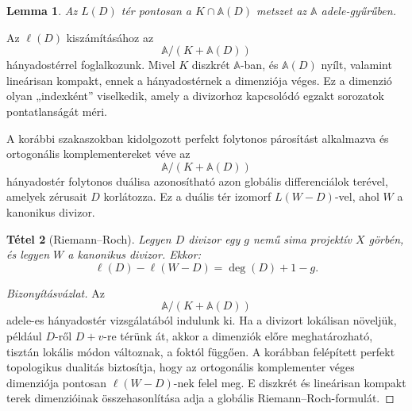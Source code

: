 \documentclass[12pt]{article}
\newtheorem{theorem}{Tétel}[section]
\newtheorem{lemma}[theorem]{Lemma}
\begin{document}
\begin{lemma}
  Az $L(D)$ tér pontosan a $K \cap \mathbb{A}(D)$ metszet az $\mathbb{A}$ adele-gyűrűben.
\end{lemma}

Az $\ell(D)$ kiszámításához az
\[
  \mathbb{A} / (K + \mathbb{A}(D))
\]
hányadostérrel foglalkozunk. Mivel $K$ diszkrét $\mathbb{A}$-ban, és $\mathbb{A}(D)$ nyílt, valamint lineárisan kompakt, ennek a hányadostérnek a dimenziója véges. Ez a dimenzió olyan „indexként” viselkedik, amely a divizorhoz kapcsolódó egzakt sorozatok pontatlanságát méri.

A korábbi szakaszokban kidolgozott perfekt folytonos párosítást alkalmazva és ortogonális komplementereket véve az
\[
  \mathbb{A} / (K + \mathbb{A}(D))
\]
hányadostér folytonos duálisa azonosítható azon globális differenciálok terével, amelyek zérusait $D$ korlátozza. Ez a duális tér izomorf $L(W - D)$-vel, ahol $W$ a kanonikus divizor.

\begin{theorem}[Riemann--Roch]
  Legyen $D$ divizor egy $g$ nemű sima projektív $X$ görbén, és legyen $W$ a kanonikus divizor. Ekkor:
  \[
    \ell(D) - \ell(W - D) = \deg(D) + 1 - g.
  \]
\end{theorem}

\begin{proof}[Bizonyításvázlat]
  Az
  \[
    \mathbb{A} / (K + \mathbb{A}(D))
  \]
  adele-es hányadostér vizsgálatából indulunk ki. Ha a divizort lokálisan növeljük, például $D$-ről $D+v$-re térünk át, akkor a dimenziók előre meghatározható, tisztán lokális módon változnak, a foktól függően. A korábban felépített perfekt topologikus dualitás biztosítja, hogy az ortogonális komplementer véges dimenziója pontosan $\ell(W - D)$-nek felel meg. E diszkrét és lineárisan kompakt terek dimenzióinak összehasonlítása adja a globális Riemann--Roch-formulát.
\end{proof}
\end{document}
